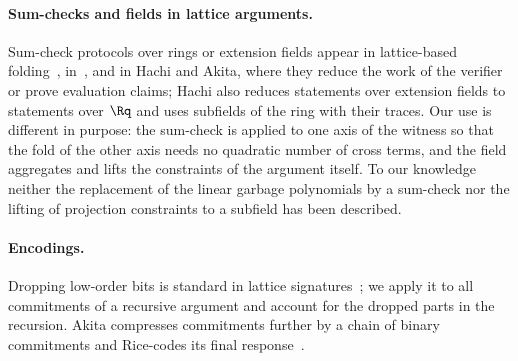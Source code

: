 \paragraph{Sum-checks and fields in lattice arguments.}
Sum-check protocols over rings or extension fields appear in lattice-based folding~\cite{BC25}, in~\cite{KLOT25}, and in Hachi and Akita, where they reduce the work of the verifier or prove evaluation claims; Hachi also reduces statements over extension fields to statements over $\Rq$ and uses subfields of the ring with their traces. Our use is different in purpose: the sum-check is applied to one axis of the witness so that the fold of the other axis needs no quadratic number of cross terms, and the field aggregates and lifts the constraints of the argument itself. To our knowledge neither the replacement of the linear garbage polynomials by a sum-check nor the lifting of projection constraints to a subfield has been described.

\paragraph{Encodings.}
Dropping low-order bits is standard in lattice signatures~\cite{BG14,DKLLSSS18}; we apply it to all commitments of a recursive argument and account for the dropped parts in the recursion. Akita compresses commitments further by a chain of binary commitments and Rice-codes its final response~\cite{DBK26}.

